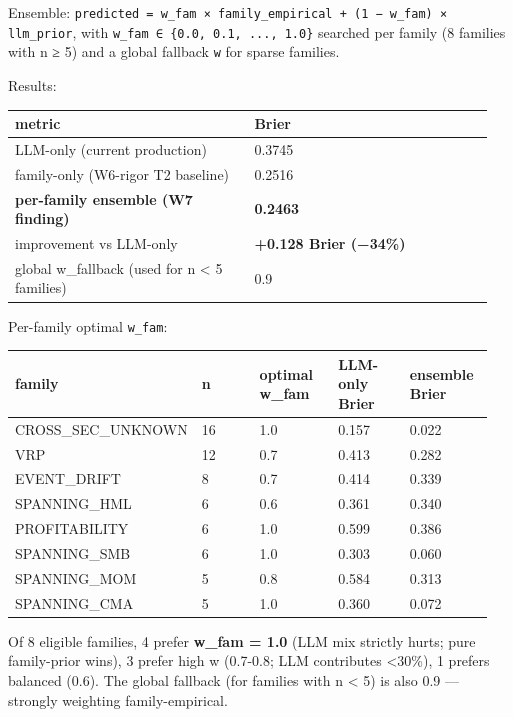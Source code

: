 \documentclass[11pt,a4paper]{article}
\begin{document}
Ensemble: \texttt{predicted = w\_fam × family\_empirical + (1 − w\_fam) × llm\_prior}, with \texttt{w\_fam ∈ \{0.0, 0.1, ..., 1.0\}} searched per family (8 families with n ≥ 5) and a global fallback \texttt{w} for sparse families.

Results:

\begin{center}
\small
\begin{tabular}{p{0.475\linewidth}p{0.475\linewidth}}
\toprule
\textbf{metric} & \textbf{Brier} \\
\midrule
LLM-only (current production) & 0.3745 \\
family-only (W6-rigor T2 baseline) & 0.2516 \\
\textbf{per-family ensemble (W7 finding)} & \textbf{0.2463} \\
improvement vs LLM-only & \textbf{+0.128 Brier (−34\%)} \\
global w\_fallback (used for n < 5 families) & 0.9 \\
\bottomrule
\end{tabular}
\end{center}

Per-family optimal \texttt{w\_fam}:

\begin{center}
\small
\begin{tabular}{p{0.190\linewidth}p{0.190\linewidth}p{0.190\linewidth}p{0.190\linewidth}p{0.190\linewidth}}
\toprule
\textbf{family} & \textbf{n} & \textbf{optimal w\_fam} & \textbf{LLM-only Brier} & \textbf{ensemble Brier} \\
\midrule
CROSS\_SEC\_UNKNOWN & 16 & 1.0 & 0.157 & 0.022 \\
VRP & 12 & 0.7 & 0.413 & 0.282 \\
EVENT\_DRIFT & 8 & 0.7 & 0.414 & 0.339 \\
SPANNING\_HML & 6 & 0.6 & 0.361 & 0.340 \\
PROFITABILITY & 6 & 1.0 & 0.599 & 0.386 \\
SPANNING\_SMB & 6 & 1.0 & 0.303 & 0.060 \\
SPANNING\_MOM & 5 & 0.8 & 0.584 & 0.313 \\
SPANNING\_CMA & 5 & 1.0 & 0.360 & 0.072 \\
\bottomrule
\end{tabular}
\end{center}

Of 8 eligible families, 4 prefer \textbf{w\_fam = 1.0} (LLM mix strictly hurts; pure family-prior wins), 3 prefer high w (0.7-0.8; LLM contributes <30\%), 1 prefers balanced (0.6). The global fallback (for families with n < 5) is also 0.9 — strongly weighting family-empirical.
\end{document}
